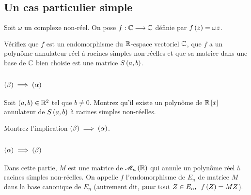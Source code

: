 \subsection*{Un cas particulier simple}

Soit \(\omega\) un complexe non-réel. On pose \(f:\mathbb{C}\longrightarrow\mathbb{C}\) définie par \(f\left(z\right)=\omega z\).

Vérifiez que \(f\) est un endomorphisme du \(\mathbb{R}\)-espace vectoriel \(\mathbb{C}\), que \(f\) a un polynôme annulateur réel à racines simples non-réelles et que sa matrice dans une base de \(\mathbb{C}\) bien choisie est une matrice \(S\left(a,b\right)\).

\begin{corr}
\end{corr}

\subsection*{\(\left(\beta\right)\implies\left(\alpha\right)\)}

\begin{q}
Soit \(\left(a,b\right)\in\mathbb{R}^2\) tel que \(b\not=0\). Montrez qu'il existe un polynôme de \(\poly[\R][x]\) annulateur de \(S\left(a,b\right)\) à racines simples non-réelles.
\end{q}

\begin{corr}
\end{corr}

\begin{q}
Montrez l'implication \(\left(\beta\right)\implies\left(\alpha\right)\).
\end{q}

\begin{corr}
\end{corr}

\subsection*{\(\left(\alpha\right)\implies\left(\beta\right)\)}

Dans cette partie, \(M\) est une matrice de \(\M{n}[\R]\) qui annule un polynôme réel à racines simples non-réelles. On appelle \(f\) l'endomorphisme de \(E_n\) de matrice \(M\) dans la base canonique de \(E_n\) (autrement dit, \(\quantifs{\tpt Z\in E_n}f\paren{Z}=MZ\)).

